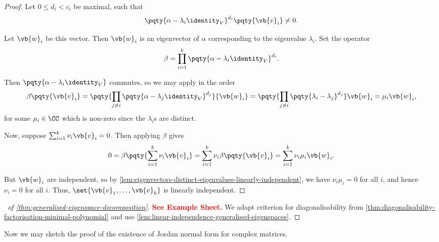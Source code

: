 \begin{proof}
    Let \(0 \leq d_i < c_i\) be maximal, such that
    \[
        \pqty{\alpha - \lambda_i \identity_V}^{d_i} \pqty{\vb{v}_i} \neq 0.
    \]

    Let \(\vb{w}_i\) be this vector. Then \(\vb{w}_i\) is an eigenvector of \(\alpha\) corresponding to the eigenvalue \(\lambda_i\). Set the operator
    \[
        \beta = \prod_{i = 1}^{k} \pqty{\alpha - \lambda_i \identity_V}^{d_i}.
    \]

    Then \(\pqty{\alpha - \lambda_i \identity_V}\) commutes, so we may apply in the order
    \[
        \beta \pqty{\vb{v}_i} = \pqty{\prod_{j \neq i} \pqty{\alpha - \lambda_j \identity_V}^{d_j}}{\vb{w}_i} = \pqty{\prod_{j \neq i} \pqty{\lambda_i - \lambda_j}^{d_j}} \vb{w}_i = \mu_i \vb{w}_i,
    \]
    for some \(\mu_i \in \CC\) which is non-zero since the \(\lambda_i\)s are distinct.

    Now, suppose \(\sum_{i = 1}^{k} \nu_i \vb{v}_i = 0\). Then applying \(\beta\) gives
    \[
        0 = \beta \pqty{\sum_{i = 1}^{k} \nu_i \vb{v}_i} = \sum_{i = 1}^{k} \nu_i \beta \pqty{\vb{v}_i} = \sum_{i = 1}^{k} \nu_i \mu_i \vb{w}_i.
    \]

    But \(\vb{w}_i\) are independent, so by \autoref{lem:eigenvectors-distinct-eigenvalues-linearly-independent}, we have \(\nu_i \mu_i = 0\) for all \(i\), and hence \(\nu_i = 0\) for all \(i\). Thus, \(\set{\vb{v}_1, \ldots, \vb{v}_k}\) is linearly independent.
\end{proof}

\begin{proof}[\proofname\ of \autoref{thm:generalised-eigenspace-decomposition}]
    \textbf{\textcolor{red}{See Example Sheet.}} We adapt criterion for diagonalisability from \autoref{thm:diagonalisability-factorisation-minimal-polynomial} and use \autoref{lem:linear-independence-generalised-eigenspaces}.
\end{proof}

\small

Now we may sketch the proof of the existence of Jordan normal form for complex matrices.

